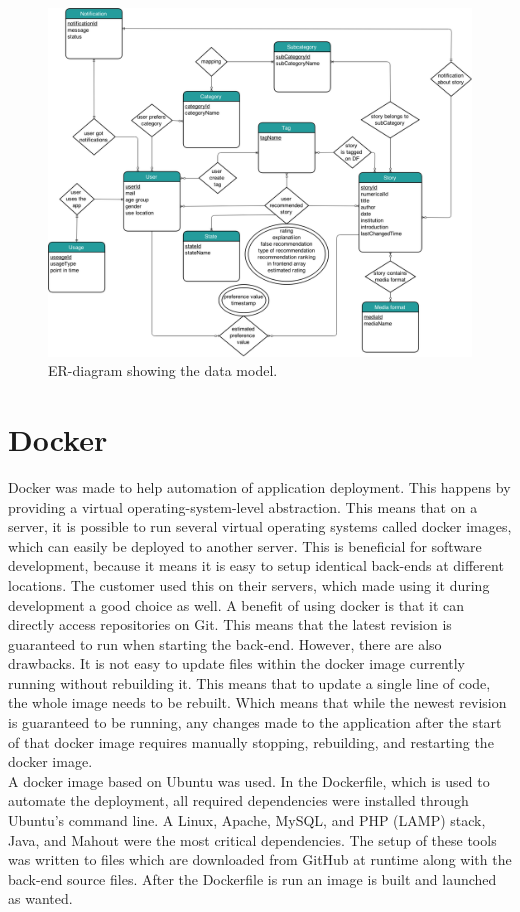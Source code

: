 \begin{figure}[h!]
	\centering
	\includegraphics[width=\textwidth]{fig/er_diagram}
	\caption{ER-diagram showing the data model.}
	\label{Fig:er_diagram}
\end{figure}


\section{Docker}
\label{subsec:docker}

Docker \cite{EHW2} was made to help automation of application deployment. This happens by providing a virtual operating-system-level abstraction. This means that on a server, it is possible to run several virtual operating systems called docker images, which can easily be deployed to another server. This is beneficial for software development, because it means it is easy to setup identical back-ends at different locations. The customer used this on their servers, which made using it during development a good choice as well. A benefit of using docker is that it can directly access repositories on Git. This means that the latest revision is guaranteed to run when starting the back-end. However, there are also drawbacks. It is not easy to update files within the docker image currently running without rebuilding it. This means that to update a single line of code, the whole image needs to be rebuilt. Which means that while the newest revision is guaranteed to be running, any changes made to the application after the start of that docker image requires manually stopping, rebuilding, and restarting the docker image. \\

A docker image based on Ubuntu was used. In the Dockerfile, which is used to automate the deployment, all required dependencies were installed through Ubuntu's command line. A Linux, Apache, MySQL, and PHP (LAMP) stack, Java, and Mahout were the most critical dependencies. The setup of these tools was written to files which are downloaded from GitHub at runtime along with the back-end source files. After the Dockerfile is run an image is built and launched as wanted.


\cleardoublepage